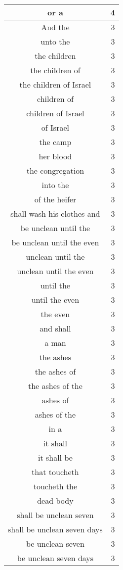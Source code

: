 \begin{center}
\begin{longtable}{|c|c|}
or a & 4\\ \hline 
And the & 3\\ \hline 
unto the & 3\\ \hline 
the children & 3\\ \hline 
the children of & 3\\ \hline 
the children of Israel & 3\\ \hline 
children of & 3\\ \hline 
children of Israel & 3\\ \hline 
of Israel & 3\\ \hline 
the camp & 3\\ \hline 
her blood & 3\\ \hline 
the congregation & 3\\ \hline 
into the & 3\\ \hline 
of the heifer & 3\\ \hline 
shall wash his clothes and & 3\\ \hline 
be unclean until the & 3\\ \hline 
be unclean until the even & 3\\ \hline 
unclean until the & 3\\ \hline 
unclean until the even & 3\\ \hline 
until the & 3\\ \hline 
until the even & 3\\ \hline 
the even & 3\\ \hline 
and shall & 3\\ \hline 
a man & 3\\ \hline 
the ashes & 3\\ \hline 
the ashes of & 3\\ \hline 
the ashes of the & 3\\ \hline 
ashes of & 3\\ \hline 
ashes of the & 3\\ \hline 
in a & 3\\ \hline 
it shall & 3\\ \hline 
it shall be & 3\\ \hline 
that toucheth & 3\\ \hline 
toucheth the & 3\\ \hline 
dead body & 3\\ \hline 
shall be unclean seven & 3\\ \hline 
shall be unclean seven days & 3\\ \hline 
be unclean seven & 3\\ \hline 
be unclean seven days & 3\\ \hline 

\end{longtable}
\end{center}

